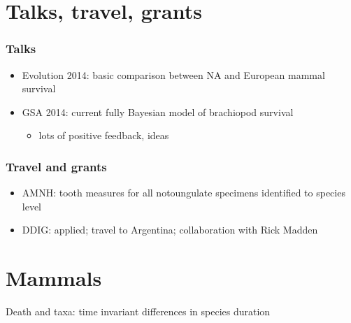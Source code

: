 \documentclass{beamer}
\begin{document}
\section{Talks, travel, grants}
\begin{frame}
  \frametitle{Talks}

  \begin{itemize}
    \item Evolution 2014: basic comparison between NA and European mammal survival 
    \item GSA 2014: current fully Bayesian model of brachiopod survival
      \begin{itemize}
        \item lots of positive feedback, ideas
      \end{itemize}
  \end{itemize}
\end{frame}

\begin{frame}
  \frametitle{Travel and grants}

  \begin{itemize}
    \item AMNH: tooth measures for all notoungulate specimens identified to species level
    \item DDIG: applied; travel to Argentina; collaboration with Rick Madden
  \end{itemize}
\end{frame}

\section{Mammals}
\begin{frame}
  Death and taxa: time invariant differences in species duration
\end{frame}
\end{document}
